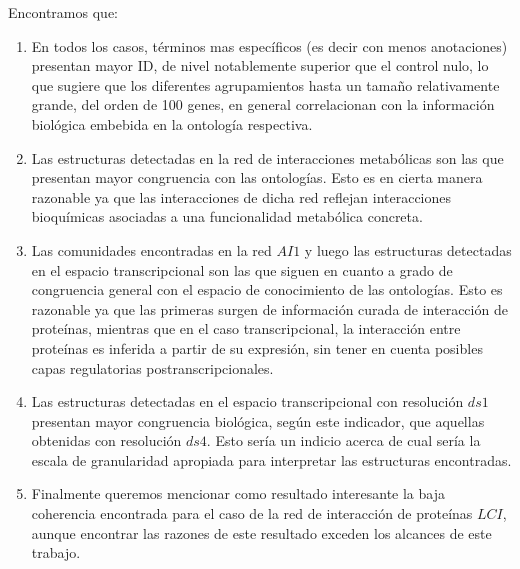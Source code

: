 Encontramos que:
\begin{enumerate}
\item En todos los casos, términos mas específicos (es decir con menos anotaciones) presentan mayor ID, de nivel notablemente superior que el control nulo, lo que sugiere que los diferentes agrupamientos hasta un tamaño relativamente grande, del orden de 100 genes, en general correlacionan con la información biológica embebida en la ontología respectiva.
\item Las estructuras detectadas en la red de interacciones metabólicas son las que presentan mayor congruencia con las ontologías. Esto es en cierta manera razonable ya que las interacciones de dicha red reflejan interacciones bioquímicas asociadas a una funcionalidad metabólica concreta.
\item Las comunidades encontradas en la red $AI1$ y luego las estructuras detectadas en el espacio transcripcional son las que siguen en cuanto a grado de congruencia general con el espacio de conocimiento de las ontologías. Esto es razonable ya que las primeras surgen de información curada de interacción de proteínas, mientras que en el caso transcripcional, la interacción entre proteínas es inferida a partir de su expresión, sin tener en cuenta posibles capas regulatorias postranscripcionales.
\item Las estructuras detectadas en el espacio transcripcional con resolución $ds1$ presentan mayor congruencia biológica, según este indicador, que aquellas obtenidas con resolución $ds4$. Esto sería un indicio acerca de cual sería la escala de granularidad apropiada para interpretar las estructuras encontradas.
\item Finalmente queremos mencionar como resultado interesante la baja coherencia encontrada para el caso de la red de interacción de proteínas $LCI$, aunque encontrar las razones de este resultado exceden los alcances de este trabajo. 
\end{enumerate}
